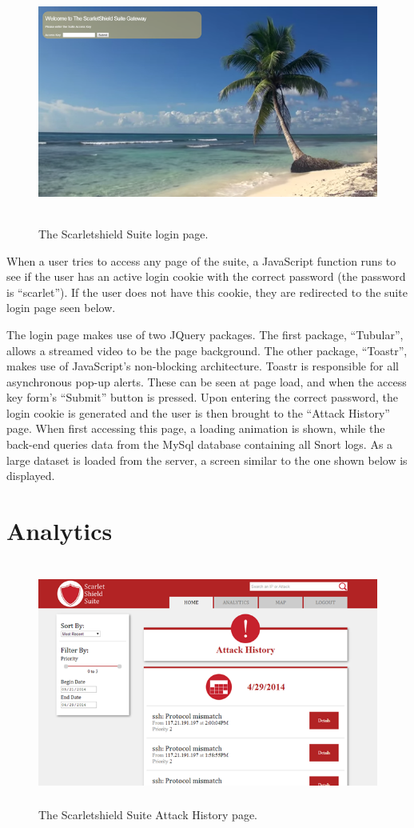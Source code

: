 \documentclass[12pt,letterpaper,titlepage]{report}
\begin{document}
{\begin{figure}[bth]
\centering
  \includegraphics[height=8cm]{./login.png}
  \caption{The Scarletshield Suite login page.}
\end{figure}

When a user tries to access any page of the suite, a JavaScript function runs to
see if the user has an active login cookie with the correct password (the
password is ``scarlet'').  If the user does not have this cookie, they are
redirected to the suite login page seen below.


The login page makes use of two JQuery packages.  The first package,
``Tubular'', allows a streamed video to be the page background.  The other
package, ``Toastr'', makes use of JavaScript’s non-blocking
architecture.  Toastr is responsible for all asynchronous pop-up alerts.  These
can be seen at page load, and when the access key form's ``Submit'' button is
pressed. Upon entering the correct password, the login cookie is generated and
the user is then brought to the ``Attack History'' page. When first accessing this
page, a loading animation is shown, while the back-end queries data from the MySql
database containing all Snort logs. As a large dataset is loaded from the
server, a screen similar to the one shown below is displayed.

\section{Analytics}

\begin{figure}[b!]
\centering
  \includegraphics[height=8cm]{./history.png}
  \caption{The Scarletshield Suite Attack History page.}
\end{figure}

}
\end{document}
